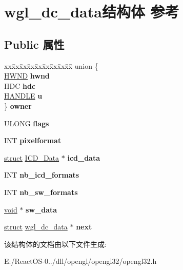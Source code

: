 \hypertarget{structwgl__dc__data}{}\section{wgl\+\_\+dc\+\_\+data结构体 参考}
\label{structwgl__dc__data}
\subsection*{Public 属性}
\begin{DoxyCompactItemize}
\item 
\mbox{\label{structwgl__dc__data_af0a3f4b93bcff0621cd7514879ea8017}} 
\begin{tabbing}
xx\=xx\=xx\=xx\=xx\=xx\=xx\=xx\=xx\=\kill
union \{\\
\>\hyperlink{interfacevoid}{HWND} {\bfseries hwnd}\\
\>HDC {\bfseries hdc}\\
\>\hyperlink{interfacevoid}{HANDLE} {\bfseries u}\\
\} {\bfseries owner}\\

\end{tabbing}\item 
\mbox{\label{structwgl__dc__data_a18ca76cfc60be0069c3f193564cefeb0}} 
U\+L\+O\+NG {\bfseries flags}
\item 
\mbox{\label{structwgl__dc__data_a52fa0158726003267bc2ed88b9c6e7ac}} 
I\+NT {\bfseries pixelformat}
\item 
\mbox{\label{structwgl__dc__data_ad3fa1254a6e597bccbdcf506fef65279}} 
\hyperlink{interfacestruct}{struct} \hyperlink{struct_i_c_d___data}{I\+C\+D\+\_\+\+Data} $\ast$ {\bfseries icd\+\_\+data}
\item 
\mbox{\label{structwgl__dc__data_afa20ac89fd23ec831ebd44a4878cfd36}} 
I\+NT {\bfseries nb\+\_\+icd\+\_\+formats}
\item 
\mbox{\label{structwgl__dc__data_a32f17ceb313ebc1b9ab8ae41d0b06a7a}} 
I\+NT {\bfseries nb\+\_\+sw\+\_\+formats}
\item 
\mbox{\label{structwgl__dc__data_afd74da23f7f16957a538c2049d941727}} 
\hyperlink{interfacevoid}{void} $\ast$ {\bfseries sw\+\_\+data}
\item 
\mbox{\label{structwgl__dc__data_acb78eb7369d7d61c556214f9546c4be8}} 
\hyperlink{interfacestruct}{struct} \hyperlink{structwgl__dc__data}{wgl\+\_\+dc\+\_\+data} $\ast$ {\bfseries next}
\end{DoxyCompactItemize}


该结构体的文档由以下文件生成\+:\begin{DoxyCompactItemize}
\item 
E\+:/\+React\+O\+S-\/0../dll/opengl/opengl32/opengl32.\+h\end{DoxyCompactItemize}
